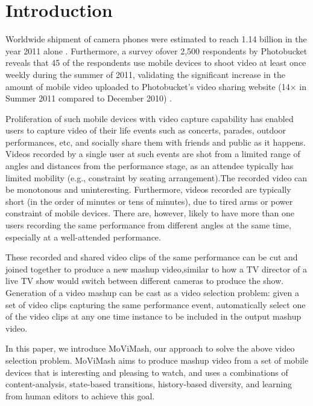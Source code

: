 \documentclass{sig-alternate}
\begin{document}



\section{Introduction}
 Worldwide shipment of camera phones were estimated to reach
1.14 billion in the year 2011 alone \cite{1}. Furthermore, a survey ofover 2,500 respondents by Photobucket reveals that 45 of the respondents use mobile devices to shoot video at least once weekly during the summer of 2011, validating the significant increase in the amount of mobile video uploaded to Photobucket’s video sharing website (14× in Summer 2011 compared to December 2010) \cite{2}.

Proliferation of such mobile devices with video capture capability has enabled users to capture video of their life events such as concerts, parades, outdoor performances, etc, and socially share them with friends and public as it happens. Videos recorded by a single user at such events are shot from a limited range of angles and distances from the performance stage, as an attendee typically has limited mobility (e.g., constraint by seating arrangement).The recorded video can be monotonous and uninteresting. Furthermore, videos recorded are typically short (in the order of minutes or tens of minutes), due to tired arms or power constraint of mobile devices. There are, however, likely to have more than one users recording the same performance from different angles at the same time, especially at a well-attended performance.

These recorded and shared video clips of the same performance can be cut and joined together to produce a new mashup video,similar to how a TV director of a live TV show would switch between different cameras to produce the show. Generation of a video mashup can be cast as a video selection problem: given a set of video clips capturing the same performance event, automatically select one of the video clips at any one time instance to be included in the output mashup video.

In this paper, we introduce MoViMash, our approach to solve the above video selection problem. MoViMash aims to produce mashup video from a set of mobile devices that is interesting and pleasing to watch, and uses a combinations of content-analysis, state-based transitions, history-based diversity, and learning from human editors to achieve this goal.
\end{document}
